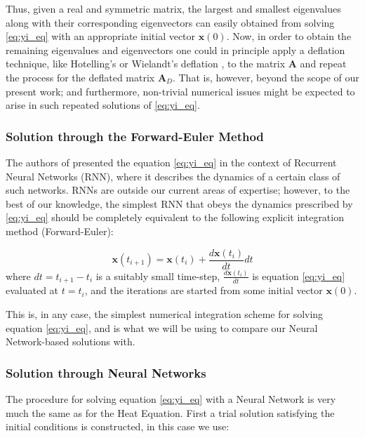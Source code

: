 \documentclass[reprint, english, nofootinbib]{revtex4-2}
\begin{document}
Thus, given a real and symmetric matrix, the largest and smallest eigenvalues along with their corresponding eigenvectors can easily obtained from solving \ref{eq:yi_eq} with an appropriate initial vector $\mathbf{x}(0)$. Now, in order to obtain the remaining eigenvalues and eigenvectors one could in principle apply a deflation technique, like Hotelling's or Wielandt's deflation \cite{Saad_2011} \cite{Roberts}, to the matrix $\mathbf{A}$ and repeat the process for the deflated matrix $\mathbf{A}_D$. That is, however, beyond the scope of our present work; and furthermore, non-trivial numerical issues might be expected to arise in such repeated solutions of \ref{eq:yi_eq}.

\subsubsection{Solution through the Forward-Euler Method}

The authors of \cite{Yi_2004} presented the equation \ref{eq:yi_eq} in the context of Recurrent Neural Networks (RNN), where it describes the dynamics of a certain class of such networks. RNNs are outside our current areas of expertise; however, to the best of our knowledge, the simplest RNN that obeys the dynamics prescribed by \ref{eq:yi_eq} should be completely equivalent to the following explicit integration method (Forward-Euler):

\begin{equation}
\label{eq:yi_euler}
\mathbf{x}(t_{i+1}) = \mathbf{x}(t_i) + \frac{d \mathbf{x}(t_i)}{dt}  dt
\end{equation}
where $dt = t_{i+1} -t_{i}$ is a suitably small time-step,  $\frac{d \mathbf{x}(t_i)}{dt}$ is equation \ref{eq:yi_eq} evaluated at $t=t_i$, and the iterations are started from some initial vector $\mathbf{x}(0)$.

This is, in any case, the simplest numerical integration scheme for solving equation \ref{eq:yi_eq}, and is what we will be using to compare our Neural Network-based solutions with.

\subsubsection{Solution through Neural Networks}

The procedure for solving equation \ref{eq:yi_eq} with a Neural Network is very much the same as for the Heat Equation. First a trial solution satisfying the initial conditions is constructed, in this case we use:
\end{document}
